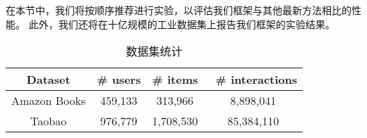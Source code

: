 
在本节中，我们将按顺序推荐进行实验，以评估我们框架与其他最新方法相比的性能。 此外，我们还将在十亿规模的工业数据集上报告我们框架的实验结果。

\begin{table}
  \centering
  \caption{\label{tab:match_stats} 数据集统计}
  \begin{tabular}{c|c|c|c}
    \hline \hline
    \textbf{Dataset} & \# users & \# items & \ \# interactions \\
    \hline
    Amazon Books & 459,133 & 313,966 & 8,898,041 \\
    Taobao & 976,779 & 1,708,530 & 85,384,110 \\
    \hline \hline
  \end{tabular}
\end{table}


